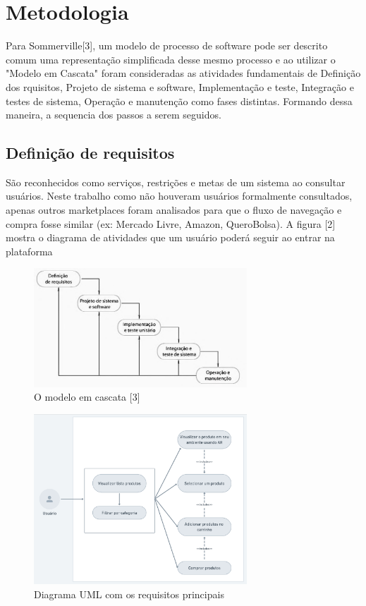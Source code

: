 \documentclass[conference]{IEEEtran}
\begin{document}
\section{Metodologia}
Para Sommerville[3], um modelo de processo de software pode ser descrito comum
uma representação simplificada desse mesmo processo e ao utilizar o "Modelo em
Cascata" foram consideradas as atividades fundamentais de Definição dos
rquisitos, Projeto de sistema e software, Implementação e teste, Integração e
testes de sistema, Operação e manutenção como fases distintas. Formando dessa
maneira, a sequencia dos passos a serem seguidos.

\subsection{Definição de requisitos}
São reconhecidos como serviços, restrições e metas de um sistema ao consultar
usuários. Neste trabalho como não houveram usuários formalmente consultados,
apenas outros marketplaces foram analisados para que o fluxo de navegação e
compra fosse similar (ex: Mercado Livre, Amazon, QueroBolsa). A figura [2]
mostra o diagrama de atividades que um usuário poderá seguir ao entrar na
plataforma

\begin{figure}[h]
  \caption{O modelo em cascata [3]}

  \centering %
  \includegraphics[width=8cm]{assets/modelo_cascata.png}
\end{figure}

\begin{figure}[h]
  \caption{Diagrama UML com os requisitos principais}

  \centering %
  \includegraphics[width=8cm]{assets/user_uml_diagram.png}
\end{figure}
\end{document}

